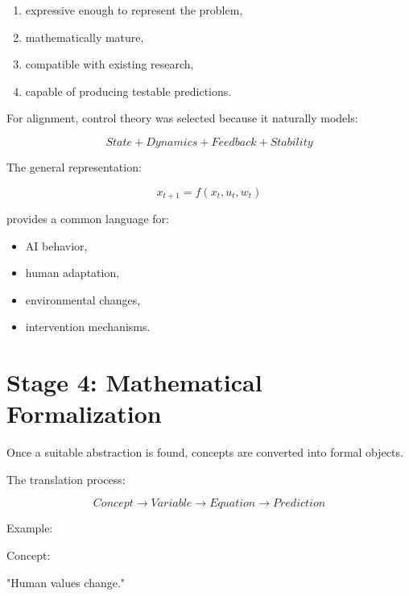 \documentclass[11pt]{article}
\begin{document}
\begin{enumerate}

\item expressive enough to represent the problem,

\item mathematically mature,

\item compatible with existing research,

\item capable of producing testable predictions.

\end{enumerate}



For alignment, control theory was selected because it naturally models:


\[
State
+
Dynamics
+
Feedback
+
Stability
\]



The general representation:


\[
x_{t+1}=f(x_t,u_t,w_t)
\]


provides a common language for:


\begin{itemize}

\item AI behavior,

\item human adaptation,

\item environmental changes,

\item intervention mechanisms.

\end{itemize}



\section{Stage 4: Mathematical Formalization}


Once a suitable abstraction is found, concepts are converted into
formal objects.


The translation process:


\[
Concept
\rightarrow
Variable
\rightarrow
Equation
\rightarrow
Prediction
\]


Example:



Concept:

"Human values change."
\end{document}
